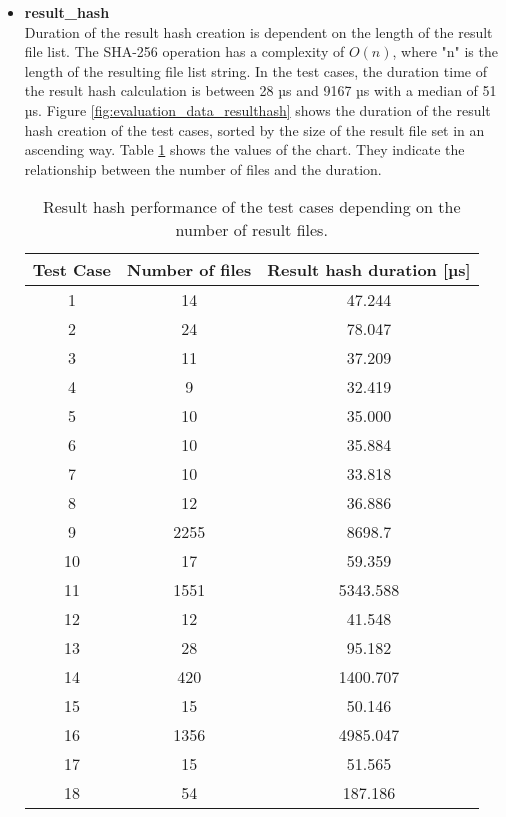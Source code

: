 \documentclass[draft,final]{vutinfth} %
\begin{document}
\begin{itemize}
	\item \textbf{result\_hash} \\
	Duration of the result hash creation is dependent on the length of the result file list. The SHA-256 operation has a complexity of $O(n)$, where "n" is the length of the resulting file list string. In the test cases, the duration time of the result hash calculation is between 28 µs and 9167 µs with a median of 51 µs. Figure \ref{fig:evaluation_data_resulthash} shows the duration of the result hash creation of the test cases, sorted by the size of the result file set in an ascending way. Table \ref{Tab:data_result_hash} shows the values of the chart. They indicate the relationship between the number of files and the duration.  
	
	\begin{table}[]
		\caption{Result hash performance of the test cases depending on the number of result files.}
		
		\centering
		\begin{tabular}{c|c|c}
			\textbf{Test Case} & \textbf{Number of files} & \textbf{Result hash duration [µs]}  \\ \hline
			1 & 14  & 47.244 \\ \hline 
			2 & 24 & 78.047 \\ \hline
			3 & 11 & 37.209 \\ \hline
			4 & 9 & 32.419 \\ \hline
			5 & 10 & 35.000 \\ \hline
			6 & 10 & 35.884 \\ \hline
			7 & 10 & 33.818 \\ \hline
			8 & 12 & 36.886 \\ \hline
			9 & 2255 & 8698.7 \\ \hline
			10 & 17 & 59.359 \\ \hline
			11 & 1551 & 5343.588 \\ \hline
			12 & 12 & 41.548 \\ \hline
			13 & 28 & 95.182 \\ \hline
			14 & 420 & 1400.707 \\ \hline
			15 & 15 & 50.146 \\ \hline
			16 & 1356 & 4985.047 \\ \hline
			17 & 15 & 51.565 \\ \hline
			18 & 54 & 187.186 \\ 
		\end{tabular}
		\label{Tab:data_result_hash}
	\end{table}
	

\end{itemize}
\end{document}
